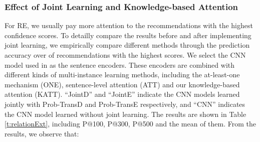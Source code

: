 \documentclass[letterpaper]{article} %
\begin{document}
\subsubsection{Effect of Joint Learning and Knowledge-based Attention}

For RE, we usually pay more attention to the recommendations with the highest confidence scores. To detailly compare the results before and after implementing joint learning, we empirically compare different methods through the prediction accuracy over of recommendations with the highest scores. We select the CNN model used in \cite{zeng2014relation} as the sentence encoders. These encoders are combined with different kinds of multi-instance learning methods, including the at-least-one mechanism (ONE), sentence-level attention (ATT) and our knowledge-based attention (KATT). ``JointD'' and ``JointE'' indicate the CNN models learned jointly with Prob-TransD and Prob-TransE respectively, and ``CNN'' indicates the CNN model learned without joint learning. The results are shown in Table \ref{t:relationExt}, including P@100, P@300, P@500 and the mean of them. From the results, we observe that:
\end{document}
